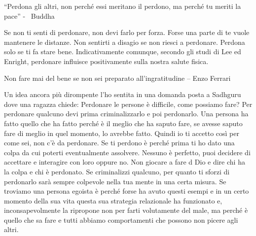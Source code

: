 \documentclass[12pt]{book} %
\begin{document}
“Perdona gli altri, non perché essi meritano il perdono, ma perché tu meriti la pace” - \ Buddha

Se non ti senti di perdonare, non devi farlo per forza. Forse una parte di te vuole mantenere le distanze. Non
sentirti a disagio se non riesci a perdonare. Perdona solo se ti fa stare bene. Indicativamente comunque, secondo gli studi di Lee ed Enright, perdonare influisce
positivamente sulla nostra salute fisica.

Non fare mai del bene se non sei preparato all'ingratitudine – Enzo Ferrari

Un idea ancora più dirompente l'ho sentita in una domanda posta a Sadhguru dove una ragazza chiede: Perdonare le persone è difficile, come possiamo fare?
Per perdonare qualcuno devi prima criminalizzarlo e poi perdonarlo. 
Una persona ha fatto quello che ha fatto perché è il meglio che ha saputo fare, se avesse saputo fare di meglio in quel momento, lo avrebbe fatto. Quindi io ti accetto così per come sei, non c'è da perdonare. Se ti perdono è perché prima ti ho dato una colpa da cui poterti eventualmente assolvere. Nessuno è perfetto, puoi decidere di accettare e interagire con loro oppure no. Non giocare a fare d
Dio e dire chi ha la colpa e chi è perdonato. Se criminalizzi qualcuno, per quanto ti sforzi di perdonarlo sarà sempre colpevole nella tua mente in una certa misura.
Se troviamo una persona egoista è perché forse ha avuto questi esempi e in un certo momento della sua vita questa sua strategia relazionale ha funzionato e, inconsapevolmente la ripropone non per farti volutamente del male, ma perché è quello che sa fare e tutti abbiamo comportamenti che possono non picere agli altri.
\end{document}
